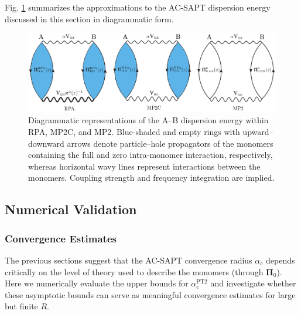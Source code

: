 \documentclass[journal=jctcce,manuscript=article]{achemso}
\begin{document}
Fig. \ref{fig:mp2c_rpa} summarizes the approximations to the AC-SAPT
dispersion energy discussed in this section in diagrammatic form.
\begin{figure}[hbpt]
  \centering
  \includegraphics{int_gold_combine.eps}
  \caption{Diagrammatic representations of the A--B dispersion energy
    within RPA, MP2C, and MP2. Blue-shaded and empty rings
    with upward--downward arrows denote particle--hole propagators
    of the monomers containing the full and zero intra-monomer
    interaction, respectively,
    whereas horizontal wavy lines represent interactions between the
    monomers. Coupling strength and frequency integration are
    implied.}
  \label{fig:mp2c_rpa}
\end{figure}

\subsection{Numerical Validation}

\subsubsection{Convergence Estimates}

The previous sections suggest that the AC-SAPT convergence radius
$\alpha_c$ depends critically on the level of theory used to describe
the monomers (through 
$\boldsymbol{\Pi}_0$). Here we numerically evaluate the upper
bounds for 
$\alpha_c^{\text{PT2}}$ and investigate whether these asymptotic bounds
can serve as meaningful convergence estimates for large but finite $R$. 
\end{document}

